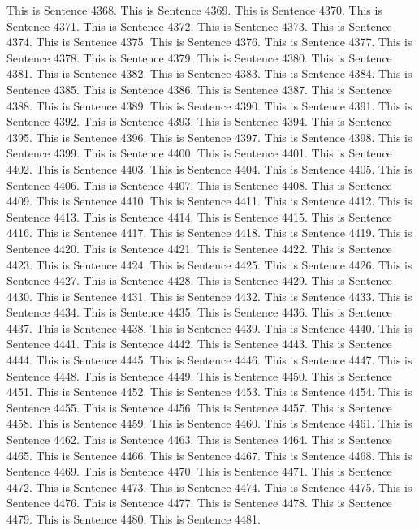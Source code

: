 \documentclass{article}
\begin{document}
This is Sentence 4368.
This is Sentence 4369.
This is Sentence 4370.
This is Sentence 4371.
This is Sentence 4372.
This is Sentence 4373.
This is Sentence 4374.
This is Sentence 4375.
This is Sentence 4376.
This is Sentence 4377.
This is Sentence 4378.
This is Sentence 4379.
This is Sentence 4380.
This is Sentence 4381.
This is Sentence 4382.
This is Sentence 4383.
This is Sentence 4384.
This is Sentence 4385.
This is Sentence 4386.
This is Sentence 4387.
This is Sentence 4388.
This is Sentence 4389.
This is Sentence 4390.
This is Sentence 4391.
This is Sentence 4392.
This is Sentence 4393.
This is Sentence 4394.
This is Sentence 4395.
This is Sentence 4396.
This is Sentence 4397.
This is Sentence 4398.
This is Sentence 4399.
This is Sentence 4400.
This is Sentence 4401.
This is Sentence 4402.
This is Sentence 4403.
This is Sentence 4404.
This is Sentence 4405.
This is Sentence 4406.
This is Sentence 4407.
This is Sentence 4408.
This is Sentence 4409.
This is Sentence 4410.
This is Sentence 4411.
This is Sentence 4412.
This is Sentence 4413.
This is Sentence 4414.
This is Sentence 4415.
This is Sentence 4416.
This is Sentence 4417.
This is Sentence 4418.
This is Sentence 4419.
This is Sentence 4420.
This is Sentence 4421.
This is Sentence 4422.
This is Sentence 4423.
This is Sentence 4424.
This is Sentence 4425.
This is Sentence 4426.
This is Sentence 4427.
This is Sentence 4428.
This is Sentence 4429.
This is Sentence 4430.
This is Sentence 4431.
This is Sentence 4432.
This is Sentence 4433.
This is Sentence 4434.
This is Sentence 4435.
This is Sentence 4436.
This is Sentence 4437.
This is Sentence 4438.
This is Sentence 4439.
This is Sentence 4440.
This is Sentence 4441.
This is Sentence 4442.
This is Sentence 4443.
This is Sentence 4444.
This is Sentence 4445.
This is Sentence 4446.
This is Sentence 4447.
This is Sentence 4448.
This is Sentence 4449.
This is Sentence 4450.
This is Sentence 4451.
This is Sentence 4452.
This is Sentence 4453.
This is Sentence 4454.
This is Sentence 4455.
This is Sentence 4456.
This is Sentence 4457.
This is Sentence 4458.
This is Sentence 4459.
This is Sentence 4460.
This is Sentence 4461.
This is Sentence 4462.
This is Sentence 4463.
This is Sentence 4464.
This is Sentence 4465.
This is Sentence 4466.
This is Sentence 4467.
This is Sentence 4468.
This is Sentence 4469.
This is Sentence 4470.
This is Sentence 4471.
This is Sentence 4472.
This is Sentence 4473.
This is Sentence 4474.
This is Sentence 4475.
This is Sentence 4476.
This is Sentence 4477.
This is Sentence 4478.
This is Sentence 4479.
This is Sentence 4480.
This is Sentence 4481.
\end{document}

